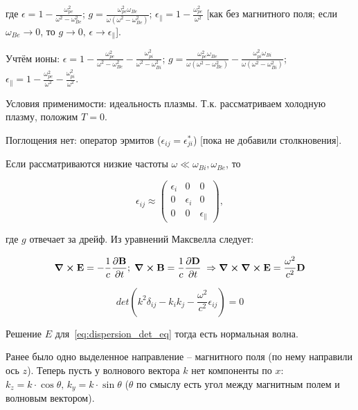 \documentclass[10pt, a4paper]{article}
\begin{document}
где $\epsilon = 1-\frac{\omega_{pe}^2}{\omega^2-\omega_{Be}^2}$; $g = \frac{\omega_{pe}^2\omega_{Be}} {\omega\left(\omega^2-\omega_{Be}^2\right)}$; $\epsilon_\parallel = 1-\frac{\omega_{pe}^2}{\omega^2}$ [как без магнитного поля; если $\omega_{Be}\rightarrow 0$, то $g\rightarrow 0,\,\epsilon\rightarrow\epsilon_\parallel$].

Учтём ионы: $\epsilon = 1-\frac{\omega_{pe}^2}{\omega^2-\omega_{Be}^2}-\frac{\omega_{pi}^2}{\omega^2-\omega_{Bi}^2}$; $g = \frac{\omega_{pe}^2\omega_{Be}} {\omega\left(\omega^2-\omega_{Be}^2\right)}-\frac{\omega_{pi}^2\omega_{Bi}} {\omega\left(\omega^2-\omega_{Bi}^2\right)}$; $\epsilon_\parallel = 1-\frac{\omega_{pe}^2}{\omega^2}-\frac{\omega_{pi}^2}{\omega^2}$.

Условия применимости: идеальность плазмы. Т.к. рассматриваем холодную плазму, положим $T = 0$. 

Поглощения нет: оператор эрмитов ($\epsilon_{ij} = \epsilon_{ji}^{*}$) [пока не добавили столкновения].

Если рассматриваются низкие частоты $\omega\ll\omega_{Bi}, \omega_{Be}$, то 

\begin{equation*}
	\epsilon_{ij} \approx
	\begin{pmatrix}
		\epsilon_i & 0 & 0 \\
		0 & \epsilon_i & 0 \\
		0 & 0 & \epsilon_\parallel
	\end{pmatrix},
\end{equation*}

где $g$ отвечает за дрейф. Из уравнений Максвелла следует:

\begin{equation*}
	\curl\vb{E} = -\frac{1}{c}\pdv{\vb{B}}{t};\; \curl\vb{B}=\frac{1}{c}\pdv{\vb{D}}{t}\;\Rightarrow\curl\curl\vb{E} = \frac{\omega^2}{c^2}\vb{D}
\end{equation*}

\begin{equation} \label{eq:dispersion_det_eq}
	det(k^2\delta_{ij}-k_ik_j-\frac{\omega^2}{c^2}\epsilon_{ij})=0
\end{equation}

Решение $E$ для~\eqref{eq:dispersion_det_eq} тогда есть нормальная волна.

Ранее было одно выделенное направление -- магнитного поля (по нему направили ось $z$). Теперь пусть у волнового вектора $k$ нет компоненты по $x$: $k_z = k\cdot\cos\theta,\,k_y = k\cdot\sin\theta$ ($\theta$ по смыслу есть угол между магнитным полем и волновым вектором). 
\end{document}
